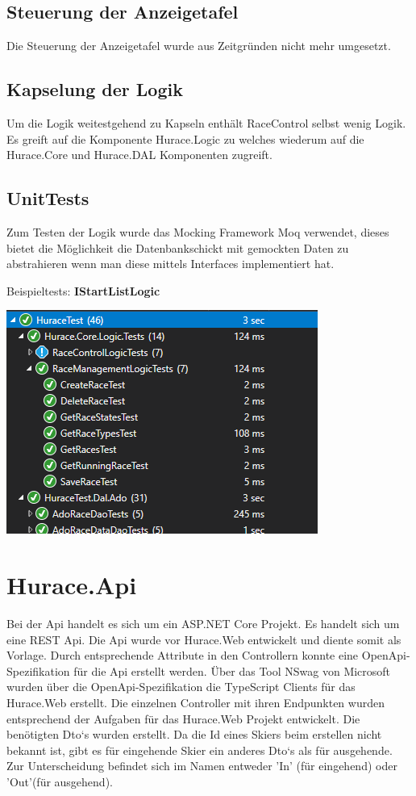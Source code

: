 \documentclass[a4paper, 12pt]{article}
\begin{document}
	
	\subsection{Steuerung der Anzeigetafel}
	Die Steuerung der Anzeigetafel wurde aus Zeitgründen nicht mehr umgesetzt.
	
	\subsection{Kapselung der Logik}
	Um die Logik weitestgehend zu Kapseln enthält RaceControl selbst wenig Logik. Es greift auf die Komponente Hurace.Logic zu welches wiederum auf die Hurace.Core und Hurace.DAL Komponenten zugreift.
	
	\subsection{UnitTests}
	Zum Testen der Logik wurde das Mocking Framework Moq verwendet, dieses bietet die Möglichkeit die Datenbankschickt mit gemockten Daten zu abstrahieren wenn man diese mittels Interfaces implementiert hat.
	
	Beispieltests:
	\textbf{IStartListLogic}
	
	
	
	\includegraphics[width=.7\textwidth]{img/UnitTests2.png}

	\newpage
	
	\section{Hurace.Api}
	Bei der Api handelt es sich um ein ASP.NET Core Projekt. Es handelt sich um eine REST Api. Die Api wurde vor Hurace.Web entwickelt und diente somit als Vorlage. Durch entsprechende Attribute in den Controllern konnte eine OpenApi-Spezifikation für die Api erstellt werden. Über das Tool NSwag von Microsoft wurden über die OpenApi-Spezifikation die TypeScript Clients für das Hurace.Web erstellt. Die einzelnen Controller mit ihren Endpunkten wurden entsprechend der Aufgaben für das Hurace.Web Projekt entwickelt. Die benötigten Dto`s wurden erstellt. Da die Id eines Skiers beim erstellen nicht bekannt ist, gibt es für eingehende Skier ein anderes Dto`s als für ausgehende. Zur Unterscheidung befindet sich im Namen entweder 'In' (für eingehend) oder 'Out'(für ausgehend). 
\end{document}
